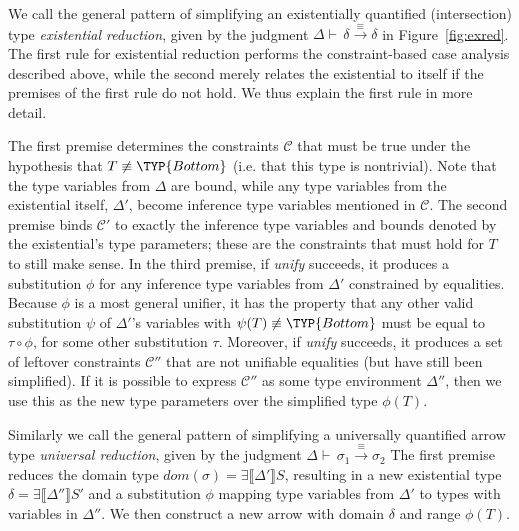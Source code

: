 \documentclass[10pt]{sigplanconf}
\newcommand{\C}{\mathcal{C}}
\newcommand{\dom}{\ensuremath{\mathit{dom}}}
\newcommand{\ob}[1]{\ensuremath{\llbracket {#1} \rrbracket}}
\newcommand{\exttype}[2][\Delta]{\ensuremath{\exists\ob{#1}{#2}}}
\newcommand{\Bottom}{\TYP{Bottom}}
\newcommand{\eqred}{\overset{\equiv}{\longrightarrow}}
\newcommand{\jtred}[2]{\ensuremath{\Delta \vdash\,{#1} \eqred {#2}}}
\begin{document}
We call the general pattern of simplifying an existentially quantified
(intersection) type \emph{existential reduction}, given by the judgment $\jtred{\delta}{\delta}$ in Figure~\ref{fig:exred}. The first rule for existential reduction performs the constraint-based case analysis described above, while the second merely relates the existential to itself if the premises of the first rule do not hold. We thus explain the first rule in more detail.

The first premise determines the constraints $\C$ that must be true under
the hypothesis that $T \not\equiv \Bottom$ (i.e. that this type is
nontrivial). Note that the type variables from $\Delta$ are bound, while any
type variables from the existential itself, $\Delta'$, become inference type
variables mentioned in $\C$. The second premise binds $\C'$ to exactly
the inference type variables and bounds denoted by the existential's type parameters; these are the constraints that must hold for $T$ to still make
sense.
In the third premise, if \textit{unify} succeeds, it
produces a substitution $\phi$ for any inference type variables from $\Delta'$ constrained by equalities. Because $\phi$ is a most general unifier, it has the property that any other valid substitution $\psi$ of $\Delta'$'s variables with
$\psi(T) \not\equiv \Bottom$ must be equal to $\tau \circ \phi$, for some
other substitution $\tau$. Moreover, if \textit{unify} succeeds, it produces
a set of leftover constraints $\C''$ that are not unifiable equalities (but have still
been simplified).
If it is possible to express $\C''$ as some type environment $\Delta''$,
then we use this as the new type parameters over the simplified type
$\phi(T)$.

Similarly we call the general pattern of simplifying a universally quantified arrow type \emph{universal reduction}, given by the judgment $\jtred{\sigma_1}{\sigma_2}$
The first premise reduces the domain type $\dom(\sigma) = \exttype[\Delta']{S}$, resulting in a new existential type $\delta = \exttype[\Delta'']{S'}$ and a substitution $\phi$ mapping type variables from $\Delta'$
to types with variables in $\Delta''$. We then construct a new arrow with domain $\delta$ and range $\phi(T)$.
\end{document}
